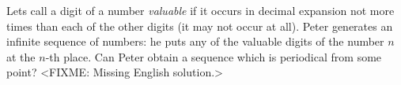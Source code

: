 \problem
Lets call a digit of a number \emph{valuable} if it occurs in decimal expansion
not more times than each of the other digits (it may not occur at all).
Peter generates an infinite sequence of numbers: he puts
any of the valuable digits of the number $n$ at the $n$-th place.
Can Peter obtain a sequence which is periodical from some point?
\solution
<FIXME: Missing English solution.>
\endproblem

